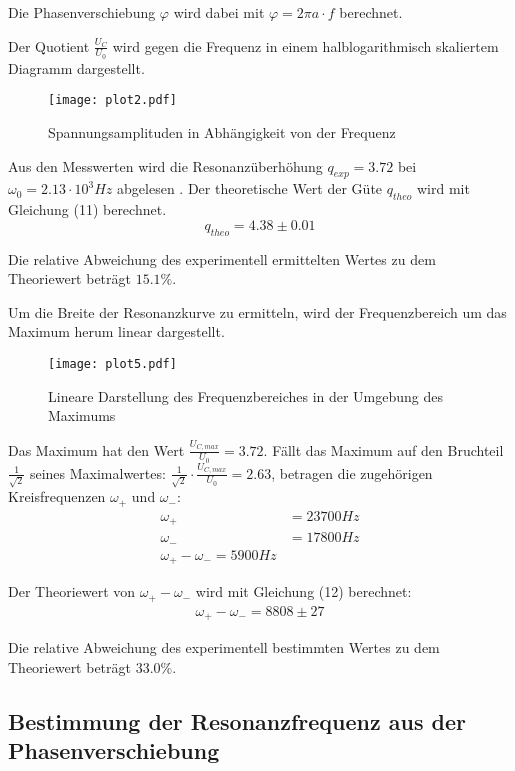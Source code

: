 Die Phasenverschiebung $\varphi$ wird dabei mit $\varphi = 2 \pi a \cdot f$ berechnet.


Der Quotient $\frac{U_C}{U_0}$ wird gegen die Frequenz in einem halblogarithmisch skaliertem Diagramm
dargestellt.


\begin{figure}[H]
  \centering
  \texttt{[image: plot2.pdf]}
  \caption{Spannungsamplituden in Abhängigkeit von der Frequenz}
  \label{fig:plot2}
\end{figure}

Aus den Messwerten wird die Resonanzüberhöhung $q_{exp} = 3.72$ bei $\omega_0 = 2.13 \cdot 10^{3}Hz$ abgelesen . Der theoretische Wert der
Güte $q_{theo}$ wird mit Gleichung (11) berechnet.
\begin{equation*}
  q_{theo} = 4.38 \pm 0.01
\end{equation*}

Die relative Abweichung des experimentell ermittelten Wertes zu dem Theoriewert beträgt $15.1\%$.

Um die Breite der Resonanzkurve zu ermitteln, wird der Frequenzbereich um das Maximum herum linear dargestellt.

\begin{figure}[H]
  \centering
  \texttt{[image: plot5.pdf]}
  \caption{Lineare Darstellung des Frequenzbereiches in der Umgebung des Maximums}
  \label{fig:plot5}
\end{figure}

Das Maximum hat den Wert $\frac{U_{C,max}}{U_0} = 3.72$. Fällt das Maximum auf den Bruchteil $\frac{1}{\sqrt{2}}$ seines Maximalwertes:
$\frac{1}{\sqrt{2}} \cdot \frac{U_{C,max}}{U_0} = 2.63$, betragen
die zugehörigen Kreisfrequenzen $\omega_+$ und $\omega_-$:
\begin{align*}
  \omega_+ &= 23700 Hz \\
  \omega_- &= 17800 Hz \\
  \omega_+ - \omega_- = 5900 Hz
\end{align*}

Der Theoriewert von $\omega_+ - \omega_-$ wird mit Gleichung (12) berechnet:
\begin{align}
  \omega_+ - \omega_- = 8808 \pm 27
\end{align}

Die relative Abweichung des experimentell bestimmten Wertes zu dem Theoriewert beträgt $33.0 \%$.


\subsection{Bestimmung der Resonanzfrequenz aus der Phasenverschiebung}


